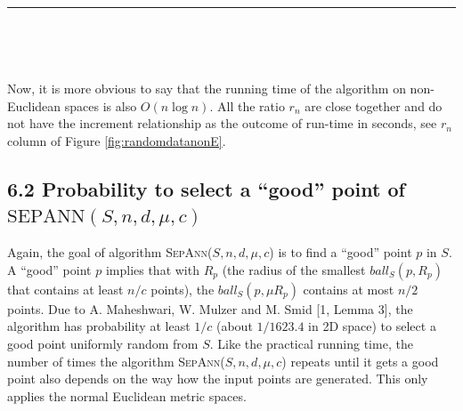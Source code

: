 \documentclass[12pt,english,]{article}
\newcommand{\pnt}[1]{{\scriptstyle#1}}
\let\origfigure\figure
\let\endorigfigure\endfigure
\renewenvironment{figure}[1][2] {
    \expandafter\origfigure\expandafter[H]
} {
    \endorigfigure
}
\begin{document}
\begin{figure}
\begin{minipage}{0.95\textwidth}
\begin{center}
\end{center}
\end{minipage}
\caption[Caption]{The graph of ratios $r_n$ versus different values of $n$ of random points on non-Euclidean spaces with $n \in \{2000, 4000, 8000, 16\,000, 32\,000\}$ (with y-scale = $1$).}
\label{fig:randomgraphnonE}
\end{figure}

\hrule

~

~

Now, it is more obvious to say that the running time of the algorithm on
non-Euclidean spaces is also \(O(n\log n)\). All the ratio \(r_n\) are
close together and do not have the increment relationship as the outcome
of run-time in seconds, see \(r_n\) column of Figure
\ref{fig:randomdatanonE}.

\hypertarget{section6.2}{%
\subsection{\texorpdfstring{6.2 Probability to select a ``good'' point
of
\(\mathrm{S\pnt{EP}A\pnt{NN}}(S,n,d,\mu,c)\)}{6.2 Probability to select a ``good'' point of \textbackslash{}mathrm\{S\textbackslash{}pnt\{EP\}A\textbackslash{}pnt\{NN\}\}(S,n,d,\textbackslash{}mu,c)}}\label{section6.2}}

Again, the goal of algorithm \textsc{SepAnn($S,n,d,\mu,c$)} is to find a
``good'' point \(p\) in \(S\). A ``good'' point \(p\) implies that with
\(R_p\) (the radius of the smallest \(ball_S(p,R_p)\) that contains at
least \(n/c\) points), the \(ball_S(p,\mu R_p)\) contains at most
\(n/2\) points. Due to A. Maheshwari, W. Mulzer and M. Smid {[}1, Lemma
3{]}, the algorithm has probability at least \(1/c\) (about \(1/1623.4\)
in 2D space) to select a good point uniformly random from \(S\). Like
the practical running time, the number of times the algorithm
\textsc{SepAnn($S,n,d,\mu,c$)} repeats until it gets a good point also
depends on the way how the input points are generated. This only applies
the normal Euclidean metric spaces.
\end{document}

